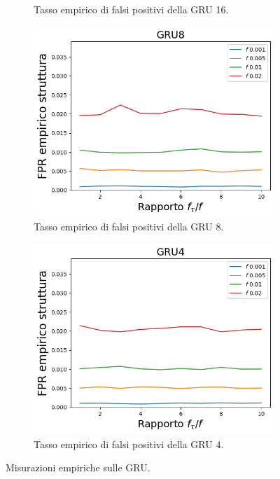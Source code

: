 \documentclass[../../main.tex]{subfiles}
\begin{document}
\begin{figure}[H]
\begin{subfigure}[b]{0.32\textwidth}
            \caption{Tasso empirico di falsi positivi della GRU 16.}
            \label{fig:SLBFFPR_GRU16}
        \end{subfigure}
        \begin{subfigure}[b]{0.32\textwidth}
            \centering
            \includegraphics[width = \textwidth]{immagini/7/SLBF/GRU8_FPR.png}
            \caption{Tasso empirico di falsi positivi della GRU 8.}
            \label{fig:SLBFFPR_GRU8}
        \end{subfigure}
        \begin{subfigure}[b]{0.32\textwidth}
            \centering
            \includegraphics[width = \textwidth]{immagini/7/SLBF/GRU4_FPR.png}
            \caption{Tasso empirico di falsi positivi della GRU 4.}
            \label{fig:SLBFFPR_GRU4}
        \end{subfigure}
        \caption{Misurazioni empiriche sulle GRU.}
        \label{fig:GRUEmpiricoSLBF}
    \end{figure}
\end{document}
